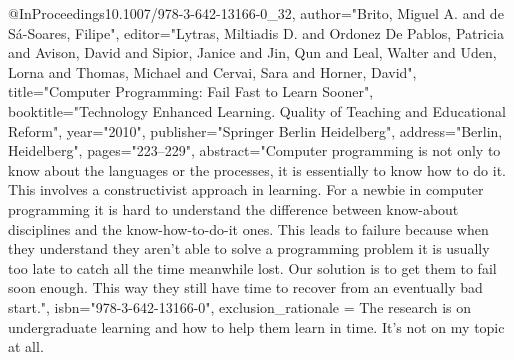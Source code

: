 @InProceedings{10.1007/978-3-642-13166-0_32,
    author="Brito, Miguel A.
    and de S{\'a}-Soares, Filipe",
    editor="Lytras, Miltiadis D.
    and Ordonez De Pablos, Patricia
    and Avison, David
    and Sipior, Janice
    and Jin, Qun
    and Leal, Walter
    and Uden, Lorna
    and Thomas, Michael
    and Cervai, Sara
    and Horner, David",
    title="Computer Programming: Fail Fast to Learn Sooner",
    booktitle="Technology Enhanced Learning. Quality of Teaching and Educational Reform",
    year="2010",
    publisher="Springer Berlin Heidelberg",
    address="Berlin, Heidelberg",
    pages="223--229",
    abstract="Computer programming is not only to know about the languages or the processes, it is essentially to know how to do it. This involves a constructivist approach in learning. For a newbie in computer programming it is hard to understand the difference between know-about disciplines and the know-how-to-do-it ones. This leads to failure because when they understand they aren't able to solve a programming problem it is usually too late to catch all the time meanwhile lost. Our solution is to get them to fail soon enough. This way they still have time to recover from an eventually bad start.",
    isbn="978-3-642-13166-0",
    exclusion_rationale = {The research is on undergraduate learning and how to help them learn in time. It's not on my topic at all.}
}
